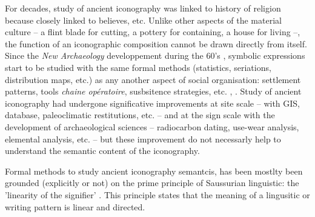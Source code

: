\documentclass[article]{jss}
\begin{document}

For decades, study of ancient iconography was linked to history of religion because closely linked to believes, etc. Unlike other aspects of the material culture -- a flint blade for cutting, a pottery for containing, a house for living --, the function of an iconographic composition cannot be drawn directly from itself. Since the \textit{New Archaeology} developpement during the 60's \citep{Clarke14}, symbolic expressions start to be studied with the same formal methods (statistics, seriations, distribution maps, etc.) as any another aspect of social organisation: settlement patterns, tools \emph{chaine opératoire}, susbsitence strategies, etc. \citep{Renfrew91}, \citep{LeroiGourhan92}. Study of ancient iconography had  undergone significative improvements at site scale -- with GIS, database, paleoclimatic restitutions, etc. -- and at the sign scale with the development of archaeological sciences -- radiocarbon dating, use-wear analysis, elemental analysis, etc. -- but these improvement do not necessarly help to understand the semantic content of the iconography.

Formal methods to study ancient iconography semantcis, has been mostlty been grounded (explicitly or not) on the prime principle of Saussurian linguistic: the 'linearity of the signifier' \citep{Saussure89}. This principle states that the meaning of a lingusitic or writing pattern is linear and directed. 
\end{document}
